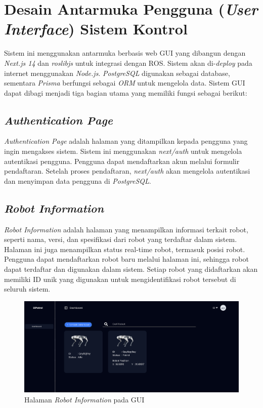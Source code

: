 \section{Desain Antarmuka Pengguna (\emph{User Interface}) Sistem Kontrol}

Sistem ini menggunakan antarmuka berbasis web GUI yang dibangun dengan \emph{Next.js 14} dan \emph{roslibjs} untuk integrasi dengan ROS. Sistem akan di-\emph{deploy} pada internet menggunakan \emph{Node.js}. \emph{PostgreSQL} digunakan sebagai database, sementara \emph{Prisma} berfungsi sebagai \emph{ORM} untuk mengelola data. Sistem GUI dapat dibagi menjadi tiga bagian utama yang memiliki fungsi sebagai berikut:

\subsection{\emph{Authentication Page}}

\emph{Authentication Page} adalah halaman yang ditampilkan kepada pengguna yang ingin mengakses sistem. Sistem ini menggunakan \emph{next/auth} untuk mengelola autentikasi pengguna. Pengguna dapat mendaftarkan akun melalui formulir pendaftaran. Setelah proses pendaftaran, \emph{next/auth} akan mengelola autentikasi dan menyimpan data pengguna di \emph{PostgreSQL}.

\subsection{\emph{Robot Information}}

\emph{Robot Information} adalah halaman yang menampilkan informasi terkait robot, seperti nama, versi, dan spesifikasi dari robot yang terdaftar dalam sistem. Halaman ini juga menampilkan status real-time robot, termasuk posisi robot. Pengguna dapat mendaftarkan robot baru melalui halaman ini, sehingga robot dapat terdaftar dan digunakan dalam sistem. Setiap robot yang didaftarkan akan memiliki ID unik yang digunakan untuk mengidentifikasi robot tersebut di seluruh sistem.
\begin{figure}[H] \centering
  \includegraphics[scale=0.37]{gambar/robot_ui.png}
  \caption{Halaman \emph{Robot Information} pada GUI}
  \label{fig:robot_info}
\end{figure}

